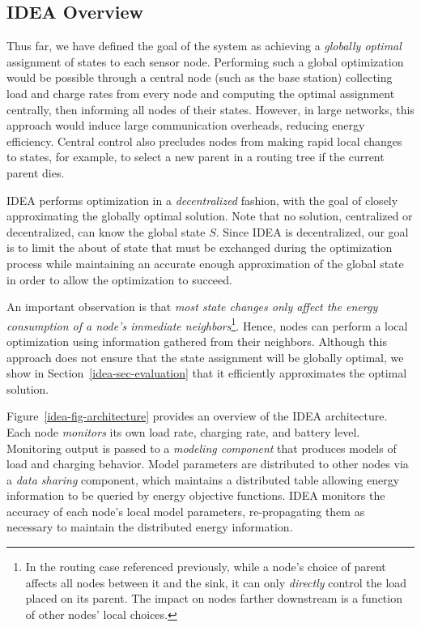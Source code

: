 \subsection{IDEA Overview}

Thus far, we have defined the goal of the system as achieving a
\textit{globally optimal} assignment of states to each sensor node.
Performing such a global optimization would be possible through a central
node (such as the base station) collecting load and charge rates from every
node and computing the optimal assignment centrally, then informing all nodes
of their states. However, in large networks, this approach would induce large
communication overheads, reducing energy efficiency. Central control also
precludes nodes from making rapid local changes to states, for example, to
select a new parent in a routing tree if the current parent dies.

IDEA performs optimization in a \textit{decentralized} fashion, with the goal
of closely approximating the globally optimal solution. Note that no
solution, centralized or decentralized, can know the global state $S$. Since
IDEA is decentralized, our goal is to limit the about of state that must be
exchanged during the optimization process while maintaining an accurate
enough approximation of the global state in order to allow the optimization
to succeed.

An important observation is that \textit{most state changes only affect the
energy consumption of a node's immediate neighbors}\footnote{In the routing
case referenced previously, while a node's choice of parent affects all nodes
between it and the sink, it can only \textit{directly} control the load
placed on its parent. The impact on nodes farther downstream is a function of
other nodes' local choices.}. Hence, nodes can perform a local optimization
using information gathered from their neighbors. Although this approach does
not ensure that the state assignment will be globally optimal, we show in
Section~\ref{idea-sec-evaluation} that it efficiently approximates the
optimal solution.

Figure~\ref{idea-fig-architecture} provides an overview of the IDEA
architecture. Each node \textit{monitors} its own load rate, charging rate,
and battery level. Monitoring output is passed to a \textit{modeling
component} that produces models of load and charging behavior. Model
parameters are distributed to other nodes via a \textit{data sharing}
component, which maintains a distributed table allowing energy information to
be queried by energy objective functions. IDEA monitors the accuracy of each
node's local model parameters, re-propagating them as necessary to maintain
the distributed energy information.

